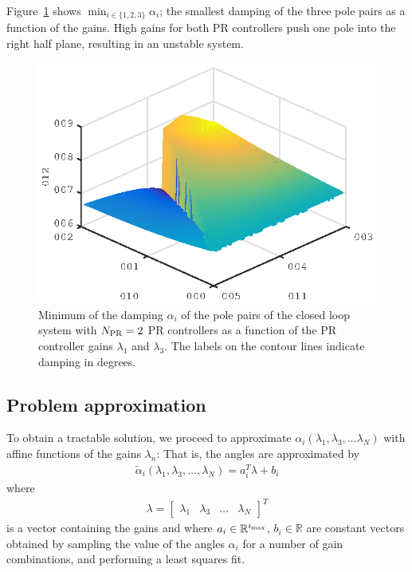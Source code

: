 \documentclass[conference,10pt]{IEEEtran}
\begin{document}
Figure~\ref{fig:DampingExample} shows $\min_{i\in\{1,2,3\}}\alpha_i$; the smallest damping of the three pole pairs as a function of the gains. High gains for both PR controllers push one pole into the right half plane, resulting in an unstable system.
\begin{figure}[!h]
\centering

\includegraphics{fig/root_locus_2D_in_3D}
\caption{Minimum of the damping $\alpha_i$ of the pole pairs of the closed loop system with $N_{\rm PR}=2$ PR controllers as a function of the PR controller gains $\lambda_1$ and $\lambda_3$. The labels on the contour lines indicate damping in degrees.}
\label{fig:DampingExample}
\end{figure}


\subsection{Problem approximation}

To obtain a tractable solution, we proceed to approximate $\alpha_i(\lambda_1,\lambda_3,\dots\lambda_N)$ with affine functions of the gains $\lambda_n$: That is, the angles are approximated by
\begin{align}
\label{eq:AngleApprox}
\tilde{\alpha}_i(\lambda_1,\lambda_3,\dots, \lambda_N)
= a_i^T\lambda + b_i
\end{align}
where
\begin{align*}
\lambda =
\begin{bmatrix}
\lambda_1 & \lambda_3 & \dots & \lambda_N
\end{bmatrix}^T
\end{align*}
is a vector containing the gains and where $a_i\in\mathbb{R}^{i_{\rm max}}$, $b_i\in\mathbb{R}$ are constant vectors obtained by sampling the value of the angles
$\alpha_i$ for a number of gain combinations, and performing a least squares fit.
\end{document}
